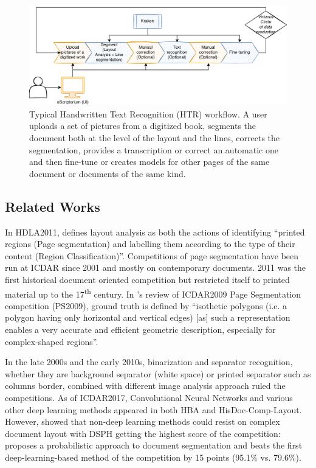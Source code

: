 \documentclass{jdmdh}
\begin{document}
\begin{figure}[h]
    \centering
    \includegraphics[width=\linewidth]{images/kraken-escriptorium.png}
    \caption{Typical Handwritten Text Recognition (HTR) workflow. A user uploads a set of pictures from a digitized book, segments the document both at the level of the layout and the lines, corrects the segmentation, provides a transcription or correct an automatic one and then fine-tune or creates models for other pages of the same document or documents of the same kind.}
    \label{fig:htr-workflow}
\end{figure}

\subsection{Related Works}

In HDLA2011, \citet{antonacopoulos2011historical} defines layout analysis as both the actions of identifying ``printed regions (Page segmentation) and labelling them according to the type of their content (Region Classification)''. Competitions of page segmentation have been run at ICDAR since 2001 and mostly on contemporary documents. 2011 was the first historical document oriented competition but restricted itself to printed material up to the 17\textsuperscript{th} century. In \citet{antonacopoulos2009icdar}'s review of ICDAR2009 Page Segmentation competition (PS2009), ground truth is defined by ``isothetic polygons (i.e. a polygon having only horizontal and vertical edges) [as] such a representation enables a very accurate and efficient geometric description, especially for complex-shaped regions''. 

In the late 2000s and the early 2010s, binarization and separator recognition, whether they are background separator (white space) or printed separator such as columns border, combined with different image analysis approach ruled the competitions. As of ICDAR2017, Convolutional Neural Networks and various other deep learning methods appeared in both HBA and HisDoc-Comp-Layout. However, \citet{antonacopoulos2009icdar} showed that non-deep learning methods could resist on complex document layout with DSPH getting the highest score of the competition: \citet{lu2021probabilistic} proposes a probabilistic approach to document segmentation and beats the first deep-learning-based method of the competition by 15 points (95.1\% vs. 79.6\%).
\end{document}
